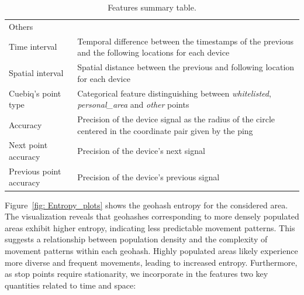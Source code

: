 \documentclass{article}
\begin{document}
\begin{table}[b!]
\begin{scriptsize}
\begin{tabular}{ll}
            Others & \\
            \hspace{4mm} Time interval & Temporal difference between the timestamps of the previous and the following locations for each device \\
		\hspace{4mm} Spatial interval & Spatial distance between the previous and following location for each device \\
	    \hspace{4mm} Cuebiq's point type     & Categorical feature distinguishing between \textit{whitelisted}, \textit{personal\_area} and \textit{other} points \\
	    \hspace{4mm} Accuracy     &  Precision of the device signal as the radius of the circle centered in the coordinate pair given by the ping \\
            \hspace{4mm} Next point accuracy     &  Precision of the device's next signal  \\
            \hspace{4mm} Previous point accuracy     &  Precision of the device's previous signal  \\
  
  
		\bottomrule
	\end{tabular}
	\label{tab:feature}
 
 \end{scriptsize}
 \vspace{4mm}
 \caption{Features summary table.}
\vspace{-3.5mm}
\end{table}
Figure~\ref{fig: Entropy_plots} shows the geohash entropy for the considered area. The visualization reveals that geohashes corresponding to more densely populated areas exhibit higher entropy, indicating less predictable movement patterns.
This suggests a relationship between population density and the complexity of movement patterns within each geohash. Highly populated areas likely experience more diverse and frequent movements, leading to increased entropy.
Furthermore, as stop points require stationarity, we incorporate in the features two key quantities related to time and space:
\end{document}
